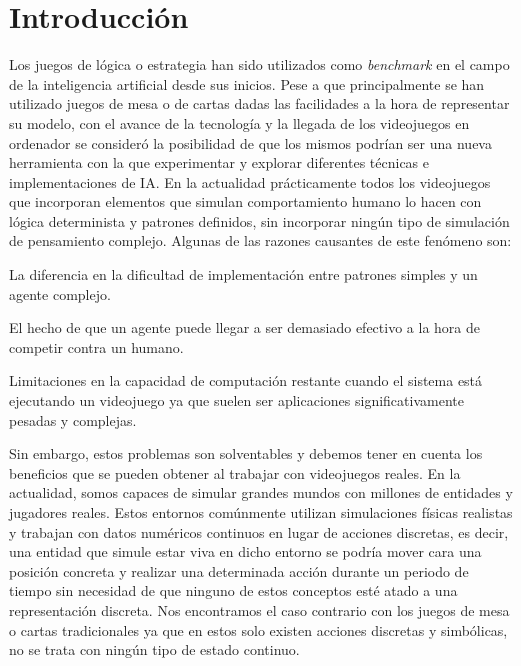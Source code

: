 \chapter{Introducción}

Los juegos de lógica o estrategia han sido utilizados como {\it benchmark} en el campo de la inteligencia artificial desde sus inicios. Pese a que principalmente se han utilizado juegos de mesa o de cartas dadas las facilidades a la hora de representar su modelo, con el avance de la tecnología y la llegada de los videojuegos en ordenador se consideró la posibilidad de que los mismos podrían ser una nueva herramienta con la que experimentar y explorar diferentes técnicas e implementaciones de IA. En la actualidad prácticamente todos los videojuegos que incorporan elementos que simulan comportamiento humano lo hacen con lógica determinista y patrones definidos, sin incorporar ningún tipo de simulación de pensamiento complejo. Algunas de las razones causantes de este fenómeno son:

\begin{itemize}
{\item La diferencia en la dificultad de implementación entre patrones simples y un agente complejo.} 
{\item El hecho de que un agente puede llegar a ser demasiado efectivo a la hora de competir contra un humano.}
{\item Limitaciones en la capacidad de computación restante cuando el sistema está ejecutando un videojuego ya que suelen ser aplicaciones significativamente pesadas y complejas.}  
\end{itemize}


Sin embargo, estos problemas son solventables y debemos tener en cuenta los beneficios que se pueden obtener al trabajar con videojuegos reales. En la actualidad, somos capaces de simular grandes mundos con millones de entidades y jugadores reales. Estos entornos comúnmente utilizan simulaciones físicas realistas y trabajan con datos numéricos continuos en lugar de acciones discretas, es decir, una entidad que simule estar viva en dicho entorno se podría mover cara una posición concreta y realizar una determinada acción durante un periodo de tiempo sin necesidad de que ninguno de estos conceptos esté atado a una representación discreta. Nos encontramos el caso contrario con los juegos de mesa o cartas tradicionales ya que en estos solo existen acciones discretas y simbólicas, no se trata con ningún tipo de estado continuo.

